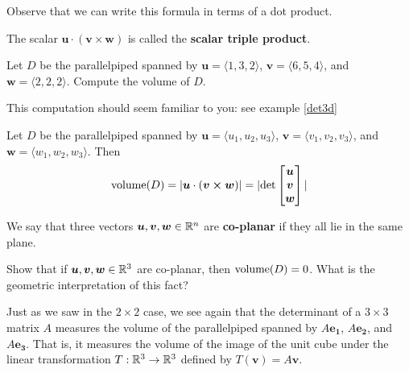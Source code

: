 Observe that we can write this formula in terms of a dot product.

\begin{definition}
        The scalar $\bm{u} \cdot (\bm{v \times w})$ is called the \textbf{scalar triple product}.
\end{definition}

\begin{example}
Let $D$ be the parallelpiped spanned by $\bm{u} = \langle 1, 3, 2 \rangle$, $\bm{v} = \langle 6, 5, 4 \rangle$, and $\bm{w} = \langle 2, 2, 2 \rangle$.  Compute the volume of $D$.

\end{example}

This computation should seem familiar to you: see example \ref{det3d}

\begin{theorem}
    Let $D$ be the parallelpiped spanned by $\bm{u} = \langle u_1, u_2, u_3 \rangle$, $\bm{v} = \langle v_1, v_2, v_3 \rangle$, and $\bm{w} = \langle w_1, w_2, w_3 \rangle$.  Then
    \begin{equation*}
\textnormal{volume}(D) = |\bm{u} \cdot (\bm{v \times w})| = | \textnormal{det}
\begin{bmatrix}
\bm{u} \\
\bm{v} \\
\bm{w} \\
\end{bmatrix}|
\end{equation*}

    \end{theorem}


\begin{example}
    \begin{definition}
        We say that three vectors $\bm{u}, \bm{v}, \bm{w} \in \mathbb{R}^n$ are \textbf{co-planar} if they all lie in the same plane. 
    \end{definition}
    
    Show that if $\bm{u}, \bm{v}, \bm{w} \in \mathbb{R}^3$ are co-planar, then $\textnormal{volume}(D) = 0$.  What is the geometric interpretation of this fact?
\end{example}

Just as we saw in the $2 \times 2$ case, we see again that the determinant of a $3 \times 3$ matrix $A$ measures the volume of the parallelpiped spanned by $A\bm{e_1}$, $A\bm{e_2}$, and $A\bm{e_3}$.  That is, it measures the volume of the image of the unit cube under the linear transformation $T: \mathbb{R}^3 \to \mathbb{R}^3$ defined by $T(\bm{v}) = A\bm{v}$.

